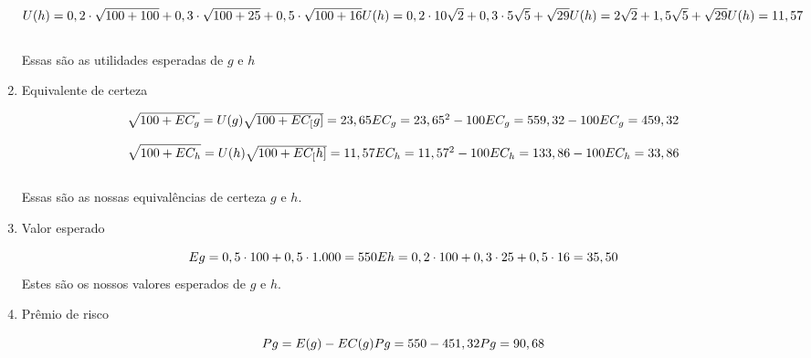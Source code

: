 \begin{flushleft}
\begin{enumerate}
	\begin{equation}
		U(h) = 0,2 \cdot \sqrt{100 + 100} + 0,3 \cdot \sqrt{100 + 25} + 0,5 \cdot \sqrt{100 +16}
		$$\\$$
		U(h) = 0,2 \cdot 10\sqrt{2}  + 0,3 \cdot 5 \sqrt{5} + \sqrt{29}
		$$\\$$
		U(h) = 2 \sqrt{2} + 1,5\sqrt{5} + \sqrt{29}
		$$\\$$
		U(h) = 11,57
	\end{equation}
	\\ Essas são as utilidades esperadas de $g$ e $h$
	
	\item Equivalente de certeza
	
	\begin{equation}
	\sqrt{100 + EC_{g}} = U(g)
	$$\\$$
	\sqrt{100 + EC_[g]} = 23,65
	$$\\$$
	EC_{g} = 23,65^{2} - 100
	$$\\$$
	EC_{g} = 559,32 - 100
	$$\\$$
	EC_{g} = 459,32
	\end{equation}
	
	\begin{equation}
	\sqrt{100 + EC_{h}} = U(h)
	$$\\$$
	\sqrt{100 + EC_[h]} = 11,57
	$$\\$$
	EC_{h} = 11,57^{2} - 100
	$$\\$$
	EC_{h} = 133,86 - 100
	$$\\$$
	EC_{h} = 33,86
	\end{equation}
	\\ Essas são as nossas equivalências de certeza $g$ e $h$.
	
	\item Valor esperado
	
	\begin{equation}
		Eg = 0,5 \cdot 100 + 0,5 \cdot 1.000 = 550
		$$\\$$
		Eh = 0,2 \cdot 100 + 0,3 \cdot 25 + 0,5 \cdot 16 = 35,50
	\end{equation}
	Estes são os nossos valores esperados de $g$ e $h$.
	
	\item Prêmio de risco
	
	\begin{equation}
	Pg = E(g) - EC(g)
	$$\\$$
	Pg = 550 - 451,32
	$$\\$$
	Pg = 90,68
	\end{equation}
	

\end{enumerate}
\end{flushleft}
